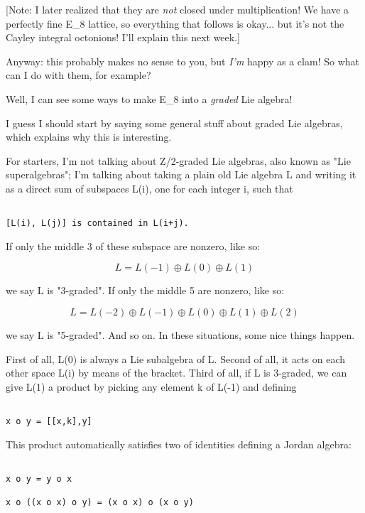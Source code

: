 [Note: I later realized that they are \emph{not} closed under 
multiplication!  We have a perfectly fine E_{8} lattice, so
everything that follows is okay... but it's not the Cayley integral 
octonions!  I'll explain this next week.]

Anyway: this probably makes no sense to you, but \emph{I'm} happy as a clam!
So what can I do with them, for example?

Well, I can see some ways to make E_{8} into a \emph{graded} Lie algebra!

I guess I should start by saying some general stuff about graded Lie
algebras, which explains why this is interesting.


For starters, I'm not talking about Z/2-graded Lie algebras, also known
as "Lie superalgebras"; I'm talking about taking a plain old
Lie algebra L and writing it as a direct sum of subspaces L(i), one for
each integer i, such that


\begin{verbatim}

[L(i), L(j)] is contained in L(i+j).
\end{verbatim}
    
If only the middle 3 of these subspace are nonzero, like so:


$$

L = L(-1) \oplus  L(0) \oplus  L(1)
$$
    
we say L is "3-graded". If only the middle 5 are nonzero, like so:


$$

L = L(-2) \oplus  L(-1) \oplus  L(0) \oplus  L(1) \oplus  L(2)
$$
    

we say L is "5-graded".  And so on.  In these situations,
some nice things happen.

First of all, L(0) is always a Lie subalgebra of L.  Second of all, 
it acts on each other space L(i) by means of the bracket.  Third of all,
if L is 3-graded, we can give L(1) a product by picking any element k of
L(-1) and defining


\begin{verbatim}

x o y = [[x,k],y]
\end{verbatim}
    
This product automatically satisfies two of identities defining
a Jordan algebra: 


\begin{verbatim}

x o y = y o x

x o ((x o x) o y) = (x o x) o (x o y)
\end{verbatim}
    
